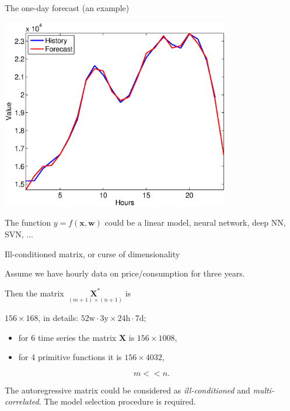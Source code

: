 \documentclass{beamer}
\begin{document}
\begin{frame}[t]{The one-day forecast (an example)}

{\hfill\includegraphics[angle=0,width=0.75\textwidth]{fig/Forecast1.eps}\hfill}

The function $y  =  f(\mathbf{x}, \mathbf{w})$ could be a linear model, neural network, deep NN, SVN, ...

\end{frame}
\begin{frame}{Ill-conditioned matrix, or curse of dimensionality}

Assume we have hourly data on price/consumption for three years.

Then the matrix~$\underset{(m+1)\times(n+1)}{\mathbf{X}^*}$  is
\begin{center}
$156 \times 168$, in details: $52\mbox{w} \cdot 3\mbox{y} \times 24\mbox{h}\cdot 7\mbox{d}$;
\end{center}

\begin{itemize}
\item for 6 time series the matrix $\mathbf{X}$ is $156 \times 1008$,
\item for 4 primitive functions it is $156 \times 4032$,
\end{itemize}
$$
m<<n.
$$

The autoregressive matrix could be considered as \emph{ill-conditioned} and \emph{multi-correlated}.
The model selection procedure is required.
\end{frame}
\end{document}
